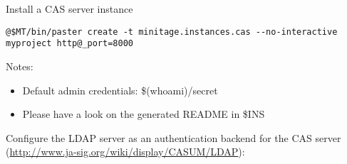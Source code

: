 \documentclass[letterpaper,10pt,english]{sphinxmanual}
\begin{document}
Install a CAS server instance

\begin{Verbatim}[commandchars=@\[\]]
@$MT/bin/paster create -t minitage.instances.cas --no-interactive myproject http@_port=8000
\end{Verbatim}

Notes:
\begin{itemize}
\item {} 
Default admin credentials:  \$(whoami)/secret

\item {} 
Please have a look on the generated README in \$INS

\end{itemize}

Configure the LDAP server as an authentication backend for the CAS server (\href{http://www.ja-sig.org/wiki/display/CASUM/LDAP}{http://www.ja-sig.org/wiki/display/CASUM/LDAP}):
\end{document}
